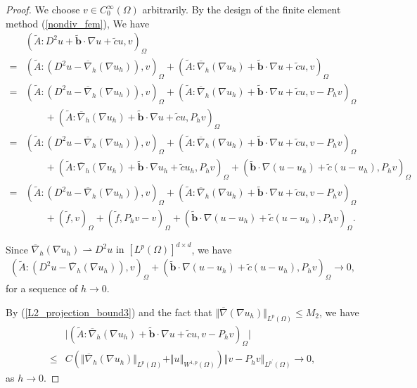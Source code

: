 \documentclass[12pt]{amsart}
\theoremstyle{definition}
\theoremstyle{remark}
\begin{document}
\begin{proof}
We choose $v \in C_{0}^{\infty}(\Omega)$ arbitrarily. 
By the design of the finite element method (\ref{nondiv_fem}), We have 
\begin{align*}
& (\tilde{A}:D^{2}u + \tilde{\boldsymbol{b}}\cdot\nabla u 
+ \tilde{c}u, v)_{\Omega} \\
= & (\tilde{A}: (D^{2}u - \overline{\nabla}_{h}(\nabla u_{h})), v)_{\Omega} 
+ (\tilde{A}:\overline{\nabla}_{h}(\nabla u_{h}) 
+ \tilde{\boldsymbol{b}}\cdot\nabla u + \tilde{c}u, v)_{\Omega} \\
= & (\tilde{A}: (D^{2}u - \overline{\nabla}_{h}(\nabla u_{h})), v)_{\Omega} 
+ (\tilde{A}:\overline{\nabla}_{h}(\nabla u_{h}) 
+ \tilde{\boldsymbol{b}}\cdot\nabla u + \tilde{c}u, v - P_{h}v)_{\Omega} \\
& \qquad + (\tilde{A}:\overline{\nabla}_{h}(\nabla u_{h}) 
+ \tilde{\boldsymbol{b}}\cdot\nabla u + \tilde{c}u, P_{h}v)_{\Omega} \\
= & (\tilde{A}: (D^{2}u - \overline{\nabla}_{h}(\nabla u_{h})), v)_{\Omega} 
+ (\tilde{A}:\overline{\nabla}_{h}(\nabla u_{h}) 
+ \tilde{\boldsymbol{b}}\cdot\nabla u + \tilde{c}u, v - P_{h}v)_{\Omega} \\
& \qquad + (\tilde{A}:\overline{\nabla}_{h}(\nabla u_{h}) 
+ \tilde{\boldsymbol{b}}\cdot\nabla u_{h} + \tilde{c}u_{h}, P_{h}v)_{\Omega} 
+ (\tilde{\boldsymbol{b}}\cdot \nabla(u - u_{h}) 
+ \tilde{c}(u - u_{h}), P_{h}v)_{\Omega} \\
= & (\tilde{A}: (D^{2}u - \overline{\nabla}_{h}(\nabla u_{h})), v)_{\Omega} 
+ (\tilde{A}:\overline{\nabla}_{h}(\nabla u_{h}) 
+ \tilde{\boldsymbol{b}}\cdot\nabla u + \tilde{c}u, v - P_{h}v)_{\Omega} \\
& \qquad + (\tilde{f}, v)_{\Omega} + (\tilde{f}, P_{h}v - v)_{\Omega} 
+ (\tilde{\boldsymbol{b}}\cdot \nabla(u - u_{h}) 
+ \tilde{c}(u - u_{h}), P_{h}v)_{\Omega}.
\end{align*}

Since $\overline{\nabla}_{h}(\nabla u_{h}) \rightharpoonup D^{2}u 
\text{ in } [L^{p}(\Omega)]^{d \times d}$, we have 
\begin{align*}
(\tilde{A}:(D^{2}u - \overline{\nabla}_{h}(\nabla u_{h})), v)_{\Omega} 
+ (\tilde{\boldsymbol{b}}\cdot \nabla(u - u_{h}) 
+ \tilde{c}(u - u_{h}), P_{h}v)_{\Omega}\rightarrow 0,
\end{align*}
for a sequence of $h \rightarrow 0$.

By (\ref{L2_projection_bound3}) and the fact that $\Vert \overline{\nabla}(\nabla u_{h})\Vert_{L^{p}(\Omega)} 
\leq M_{2}$, we have 
\begin{align*}
& \vert (\tilde{A}:\overline{\nabla}_{h}(\nabla u_{h})
+ \tilde{\boldsymbol{b}}\cdot \nabla u + \tilde{c}u, v - P_{h}v)_{\Omega} \vert \\
\leq & C \left(\Vert \overline{\nabla}_{h}(\nabla u_{h})\Vert_{L^{p}(\Omega)} 
+ \Vert u\Vert_{W^{1,p}(\Omega)}\right)\Vert v - P_{h} 
v\Vert_{L^{p^{\prime}}(\Omega)} \rightarrow 0,
\end{align*}
as $h \rightarrow 0$. 


\end{proof}
\end{document}
